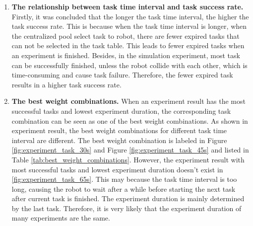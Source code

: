\begin{enumerate}
 \item \textbf{The relationship between task time interval and task success rate.} Firstly, it was concluded that the longer the task time interval, the higher the task success rate.
 This is because when the task time interval is longer, when the centralized pool select task to robot, there are fewer expired tasks that can not be selected in the task table. This leads to fewer expired tasks when an experiment is finished. Besides, in the simulation experiment, most task can be successfully finished, unless the robot collide with each other, which is time-consuming and cause task failure. Therefore, the fewer expired task results in a higher task success rate.
 \item \textbf{The best weight combinations.} When an experiment result has the most successful tasks and lowest experiment duration, the corresponding task combination can be seen as one of the best weight combinations. As shown in experiment result, the best weight combinations for different task time interval are different. 
 The best weight combination is labeled in Figure \ref{fig:experiment_task_30s} and Figure \ref{fig:experiment_task_45s} and listed in Table \ref{tab:best_weight_combinations}. However, the experiment result with most successful tasks and lowest experiment duration doesn't exist in \ref{fig:experiment_task_65s}. This may because the task time interval is too long, causing the robot to wait after a while before starting the next task after current task is finished. The experiment duration is mainly determined by the last task. Therefore, it is very likely that the experiment duration of many experiments are the same.
\begin{table}[htb]
 \centering
 \caption{Best weight combinations}
 \label{tab:best_weight_combinations}
 \end{table}
\end{enumerate}

